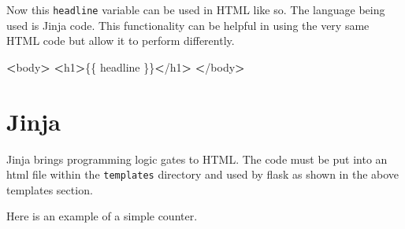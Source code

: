 \documentclass[]{book}
\newenvironment{Shaded}{\begin{snugshade}}{\end{snugshade}}
\newcommand{\KeywordTok}[1]{\textcolor[rgb]{0.13,0.29,0.53}{\textbf{#1}}}
\newcommand{\OperatorTok}[1]{\textcolor[rgb]{0.81,0.36,0.00}{\textbf{#1}}}
\newcommand{\ExtensionTok}[1]{#1}
\newcommand{\NormalTok}[1]{#1}
\begin{document}
Now this \texttt{headline} variable can be used in HTML like so. The
language being used is Jinja code. This functionality can be helpful in
using the very same HTML code but allow it to perform differently.

\begin{Shaded}
\begin{Highlighting}[]
\OperatorTok{<}\ExtensionTok{body}\OperatorTok{>}
    \OperatorTok{<}\ExtensionTok{h1}\OperatorTok{>}\NormalTok{\{\{ headline \}\}}\OperatorTok{<}\NormalTok{/}\ExtensionTok{h1}\OperatorTok{>}
\OperatorTok{<}\NormalTok{/}\ExtensionTok{body}\OperatorTok{>}
\end{Highlighting}
\end{Shaded}

\section{Jinja}\label{jinja}

Jinja brings programming logic gates to HTML. The code must be put into
an html file within the \texttt{templates} directory and used by flask
as shown in the above templates section.

\begin{Shaded}
\end{Shaded}

Here is an example of a simple counter.

\begin{Shaded}
\end{Shaded}
\end{document}
